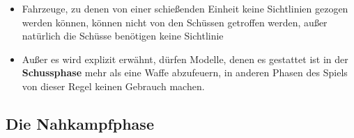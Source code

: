 \begin{itemize}
\item Fahrzeuge, zu denen von einer schießenden Einheit keine Sichtlinien
 gezogen werden können, können nicht von den Schüssen getroffen werden, außer
 natürlich die Schüsse benötigen keine Sichtlinie

\item Außer es wird explizit erwähnt, dürfen Modelle, denen es gestattet ist in
 der \textbf{Schussphase} mehr als eine Waffe abzufeuern, in anderen Phasen des
 Spiels von dieser Regel keinen Gebrauch machen.

\end{itemize}

\subsection{Die Nahkampfphase}

